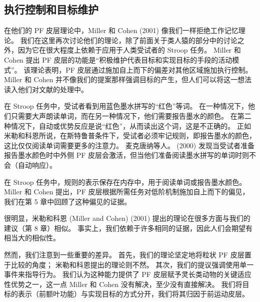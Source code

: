 \subsection{执行控制和目标维护}
在他们的 PF 皮层理论中，Miller 和 Cohen (2001) 像我们一样拒绝工作记忆理论。 我们在这里再次讨论他们的理论，除了前面关于类人猿的部分中的讨论之外，因为它在很大程度上依赖于应用于人类受试者的 Stroop 任务。 Miller 和 Cohen 提出 PF 皮层的功能是“积极维护代表目标和实现目标的手段的活动模式”。 该理论表明，PF 皮层通过施加自上而下的偏差对其他区域施加执行控制。 Miller 和 Cohen 并不像我们的提案那样强调目标的产生，但人们可以将这一想法读入他们对文献的处理中。
\par 
在 Stroop 任务中，受试者看到用蓝色墨水拼写的“红色”等词。 在一种情况下，他们只需要大声朗读单词，而在另一种情况下，他们需要报告墨水的颜色。 在第二种情况下，自动或优势反应是说“红色”，从而读出这个词，这是不正确的。 正如米勒和科恩所说，在斯特鲁普条件下，受试者必须牢记规则，即报告墨水的颜色，这比仅仅阅读单词需要更多的注意力。 麦克唐纳等人。 (2000) 发现当受试者准备报告墨水颜色时中外侧 PF 皮层会激活，但当他们准备阅读墨水拼写的单词时则不会（自动响应）。
\par 
在 Stroop 任务中，规则的表示保存在内存中，用于阅读单词或报告墨水颜色。 Miller 和 Cohen 提出，PF 皮层根据所需任务对低阶机制施加自上而下的偏见，我们在第 5 章中回顾了这种偏见的证据。
\par 
很明显，米勒和科恩 (Miller and Cohen) (2001) 提出的理论在很多方面与我们的建议（第 8 章）相似。 事实上，我们依赖于许多相同的证据，因此人们会期望有相当大的相似性。
\par 
然而，我们注意到一些重要的差异。 首先，我们的理论坚定地将粒状 PF 皮层置于比较的角度； 米勒和科恩提出的理论则不然。 其次，我们的提议强调使用单一事件来指导行为。 我们认为这种能力提供了 PF 皮层赋予灵长类动物的关键适应性优势之一，这一点 Miller 和 Cohen 没有解决，至少没有直接解决。 我们将目标的表示（前额叶功能）与实现目标的方式分开，我们将其归因于前运动皮层。

